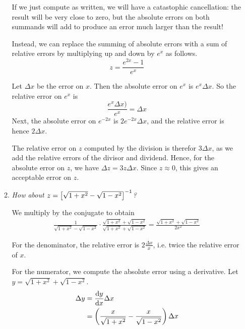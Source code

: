 \documentclass[11pt,letterpaper]{article}
\begin{document}
\begin{enumerate}
\begin{enumerate}
        If we just compute as written, we will have a catastophic cancellation:
        the result will be very close to zero, but the absolute errors on both
        summands will add to produce an error much larger than the result!

        Instead, we can replace the summing of absolute errors with a sum
        of relative errors by multiplying up and down by $e^x$ as follows.
        \begin{equation*}
          z = \frac{e^{2x} - 1}{e^x}
        \end{equation*}

        Let $\Delta x$ be the error on $x$.
        Then the absolute error on $e^x$ is $e^x \Delta x$.
        So the relative error on $e^x$ is
        \begin{equation*}
          \frac{e^x \Delta x)}{e^x} = \Delta x
        \end{equation*}
        Next, the absolute error on $e^{-2x}$ is $2 e^{-2x} \Delta x$,
        and the relative error is hence $2 \Delta x$.

        The relative error on $z$ computed by the division is therefor
        $3 \Delta x$, as we add the relative errors of the divisor and
        dividend.
        Hence, for the absolute error on $z$, we have $\Delta z = 3 z \Delta
        x$. Since $z \approx 0$, this gives an acceptable error on $z$.

      \item
        \emph{%
          How about $z = \bracks{\sqrt{1 + x^2} - \sqrt{1 - x^2}}^{-1}$?%
        }

        We multiply by the conjugate to obtain
        \begin{align*}
          \frac{1}{\sqrt{1 + x^2} - \sqrt{1 - x^2}}
          \cdot
          \frac{\sqrt{1 + x^2} + \sqrt{1 - x^2}}{
            \sqrt{1 + x^2} + \sqrt{1 - x^2}%
          }
          = \frac{\sqrt{1+x^2} + \sqrt{1 - x^2}}{2x^2}
        \end{align*}

        For the denominator, the relative error is $2 \frac{\Delta x}{x}$, i.e.
        twice the relative error of $x$.

        For the numerator, we compute the absolute error using a derivative.
        Let $y = \sqrt{1 + x^2} + \sqrt{1 - x^2}$.
        \begin{align*}
          \Delta y
          &= \deriv[y]{x} \Delta x \\
          &=
          \parens{\frac{x}{\sqrt{1 + x^2}} - \frac{x}{\sqrt{1 - x^2}}}
          \Delta x
        \end{align*}


\end{enumerate}
\end{enumerate}
\end{document}

